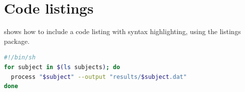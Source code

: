 \section{Code listings}
 shows how to include a code listing with syntax highlighting, using the listings package.

\begin{lstlisting}[caption={A sample shell command.},label={lst:command},language=bash]
#!/bin/sh
for subject in $(ls subjects); do
  process "$subject" --output "results/$subject.dat"
done
\end{lstlisting}
